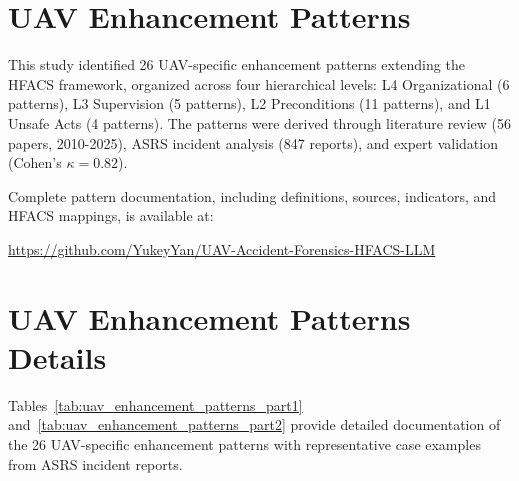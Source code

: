 
\appendix
\section{UAV Enhancement Patterns}
\label{appendix:uav_patterns}

This study identified 26 UAV-specific enhancement patterns extending the HFACS framework, organized across four hierarchical levels: L4 Organizational (6 patterns), L3 Supervision (5 patterns), L2 Preconditions (11 patterns), and L1 Unsafe Acts (4 patterns). The patterns were derived through literature review (56 papers, 2010-2025), ASRS incident analysis (847 reports), and expert validation (Cohen's $\kappa = 0.82$).

Complete pattern documentation, including definitions, sources, indicators, and HFACS mappings, is available at:

\url{https://github.com/YukeyYan/UAV-Accident-Forensics-HFACS-LLM}

\section{UAV Enhancement Patterns Details}
\label{appendix:patterns_details}

Tables~\ref{tab:uav_enhancement_patterns_part1} and~\ref{tab:uav_enhancement_patterns_part2} provide detailed documentation of the 26 UAV-specific enhancement patterns with representative case examples from ASRS incident reports.

